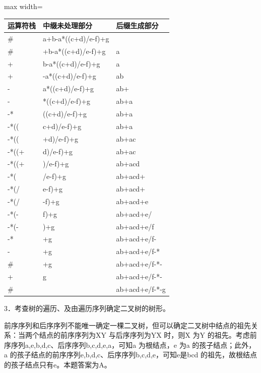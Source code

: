 \documentclass[UTF8,11pt]{ctexart}
\begin{document}
\begin{center}\begin{adjustbox}{max width=\linewidth}\begin{tabular}{|>{\raggedright\arraybackslash}p{\dimexpr(\linewidth-6\tabcolsep-4\arrayrulewidth)/3\relax}|>{\raggedright\arraybackslash}p{\dimexpr(\linewidth-6\tabcolsep-4\arrayrulewidth)/3\relax}|>{\raggedright\arraybackslash}p{\dimexpr(\linewidth-6\tabcolsep-4\arrayrulewidth)/3\relax}|}\hline
运算符栈 & 中缀未处理部分 & 后缀生成部分\\\hline
\# & a+b-a*((c+d)/e-f)+g & \\\hline
\# & +b-a*((c+d)/e-f)+g & a\\\hline
+ & b-a*((c+d)/e-f)+g & a\\\hline
+ & -a*((c+d)/e-f)+g & ab\\\hline
- & a*((c+d)/e-f)+g & ab+\\\hline
- & *((c+d)/e-f)+g & ab+a\\\hline
-* & ((c+d)/e-f)+g & ab+a\\\hline
-*(( & c+d)/e-f)+g & ab+a\\\hline
-*(( & +d)/e-f)+g & ab+ac\\\hline
-*((+ & d)/e-f)+g & ab+ac\\\hline
-*((+ & )/e-f)+g & ab+acd\\\hline
-*( & /e-f)+g & ab+acd+\\\hline
-*(/ & e-f)+g & ab+acd+\\\hline
-*(/ & -f)+g & ab+acd+e\\\hline
-*(- & f)+g & ab+acd+e/\\\hline
-*(- & )+g & ab+acd+e/f\\\hline
-* & +g & ab+acd+e/f-\\\hline
- & +g & ab+acd+e/f-*\\\hline
\# & +g & ab+acd+e/f-*-\\\hline
+ & g & ab+acd+e/f-*-\\\hline
\# &  & ab+acd+e/f-*-g\\\hline\end{tabular}\end{adjustbox}\end{center}

3．考查树的遍历、及由遍历序列确定二叉树的树形。


前序序列和后序序列不能唯一确定一棵二叉树，但可以确定二叉树中结点的祖先关系：当两个结点的前序序列为XY 与后序序列为YX 时，则X 为Y 的祖先。考虑前序序列a,e,b,d,c、后序序列b,c,d,e,a，可知a 为根结点，e 为a 的孩子结点；此外，a 的孩子结点的前序序列e,b,d,c、后序序列b,c,d,e，可知e是bcd 的祖先，故根结点的孩子结点只有e。本题答案为A。
\end{document}
